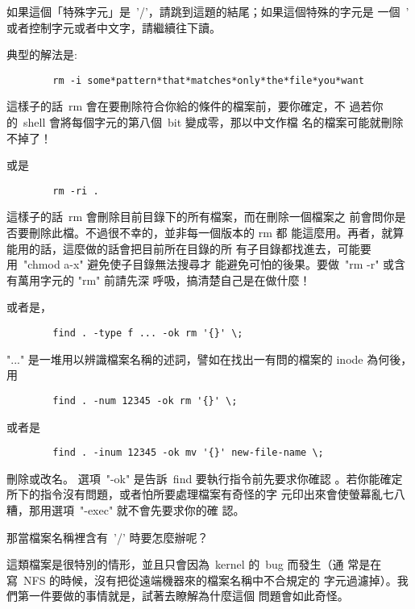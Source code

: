 \documentclass{article}
\begin{document}
\begin{CJK*}{Bg5}{ming}
	如果這個「特殊字元」是~'/'，請跳到這題的結尾；如果這個特殊的字元是
	一個~' 或者控制字元或者中文字，請繼續往下讀。

	典型的解法是:
\begin{verbatim}
        rm -i some*pattern*that*matches*only*the*file*you*want
\end{verbatim}
	這樣子的話~rm 會在要刪除符合你給的條件的檔案前，要你確定，不
	過若你的~shell 會將每個字元的第八個~bit 變成零，那以中文作檔
	名的檔案可能就刪除不掉了！

	或是	
\begin{verbatim}
        rm -ri .
\end{verbatim}
	這樣子的話~rm 會刪除目前目錄下的所有檔案，而在刪除一個檔案之
	前會問你是否要刪除此檔。不過很不幸的，並非每一個版本的 rm 都
	能這麼用。再者，就算能用的話，這麼做的話會把目前所在目錄的所
	有子目錄都找進去，可能要用~"chmod a-x" 避免使子目錄無法搜尋才
	能避免可怕的後果。要做~"rm -r" 或含有萬用字元的 "rm" 前請先深
	呼吸，搞清楚自己是在做什麼！

	或者是，	
\begin{verbatim}
        find . -type f ... -ok rm '{}' \;
\end{verbatim}
	"..." 是一堆用以辨識檔案名稱的述詞，譬如在找出一有問的檔案的 
	inode 為何後，用
\begin{verbatim}
        find . -num 12345 -ok rm '{}' \;
\end{verbatim}
	或者是
\begin{verbatim}
        find . -inum 12345 -ok mv '{}' new-file-name \;
\end{verbatim}
	刪除或改名。 選項~"-ok" 是告訴~find 要執行指令前先要求你確認
	。若你能確定所下的指令沒有問題，或者怕所要處理檔案有奇怪的字
	元印出來會使螢幕亂七八糟，那用選項~"-exec" 就不會先要求你的確
	認。

	那當檔案名稱裡含有~'/' 時要怎麼辦呢？

	這類檔案是很特別的情形，並且只會因為~kernel 的~bug 而發生（通
	常是在寫~NFS 的時候，沒有把從遠端機器來的檔案名稱中不合規定的
	字元過濾掉）。我們第一件要做的事情就是，試著去瞭解為什麼這個
	問題會如此奇怪。


\end{CJK*}
\end{document}
